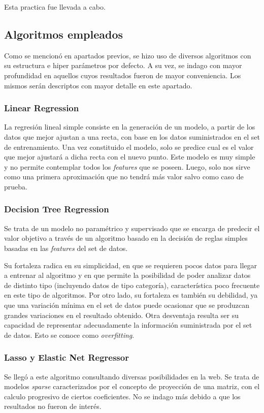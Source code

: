 \documentclass[titlepage,a4paper,11pt]{article}
\begin{document}
Esta practica fue llevada a cabo.

\subsection{Algoritmos empleados}
Como se mencionó en apartados previos, se hizo uso de diversos algoritmos con su estructura e hiper parámetros por defecto. A su vez, se indago con mayor profundidad en aquellos cuyos resultados fueron de mayor conveniencia. Los mismos serán descriptos con mayor detalle en este apartado.

\subsubsection{Linear Regression}
La regresión lineal simple consiste en la generación de un modelo, a partir de los datos que mejor ajustan a una recta, con base en los datos suministrados en el set de entrenamiento. Una vez constituido el modelo, solo se predice cual es el valor que mejor ajustará a dicha recta con el nuevo punto. Este modelo es muy simple y no permite contemplar todos los \textit{features} que se poseen. Luego, solo nos sirve como una primera aproximación que no tendrá más valor salvo como caso de prueba.

\subsubsection{Decision Tree Regression}
Se trata de un modelo no paramétrico y supervisado que se encarga de predecir el valor objetivo a través de un algoritmo basado en la decisión de reglas simples basadas en las \textit{features} del set de datos.

Su fortaleza radica en su simplicidad, en que se requieren pocos datos para llegar a entrenar al algoritmo y en que permite la posibilidad de poder analizar datos de distinto tipo (incluyendo datos de tipo categoría), característica poco frecuente en este tipo de algoritmos. Por otro lado, su fortaleza es también su debilidad, ya que una variación mínima en el set de datos puede ocasionar que se produzcan grandes variaciones en el resultado obtenido. Otra desventaja resulta ser su capacidad de representar adecuadamente la información suministrada por el set de datos. Esto se conoce como \textit{overfitting}.


\subsubsection{Lasso y Elastic Net Regressor}
Se llegó a este algoritmo consultando diversas posibilidades en la web. Se trata de modelos \textit{sparse} caracterizados por el concepto de proyección de una matriz, con el calculo progresivo de ciertos coeficientes. No se indago más debido a que los resultados no fueron de interés.
\end{document}
